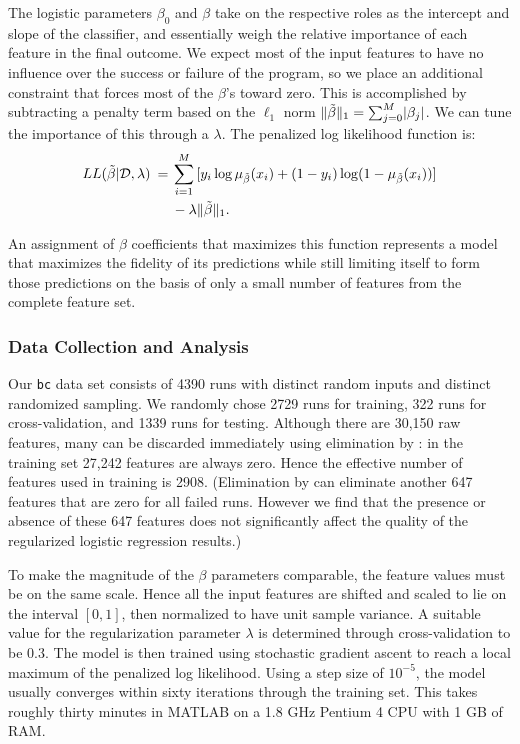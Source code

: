 The logistic parameters $\beta_0$ and $\beta$ take on the respective roles as
the intercept and slope of the classifier, and essentially weigh the
relative importance of each feature in the final outcome.  We expect
most of the input features to have no influence over the success or
failure of the program, so we place an additional constraint that
forces most of the $\beta$'s toward zero.  This is accomplished by
subtracting a penalty term based on the $\ell_1$ norm $\lVert\tilde{\beta}\rVert_1 =
\sum_{j=0}^M \lvert\beta_j\rvert$.  We can tune the importance of this
 through a  $\lambda$.  The penalized log likelihood function is:
\begin{equation*}
  \begin{split}
    LL (\tilde{\beta} | \mathcal{D}, \lambda ) \:=\:
    & \sum_{i=1}^M \, [y_i \log \mu_{\tilde{\beta}} (x_i) + (1 - y_i) \log (1 - \mu_{\tilde{\beta}} (x_i))] \\
    & - \lambda \lVert\tilde{\beta}\rVert_1.
  \end{split}
\end{equation*}

An assignment of $\beta$ coefficients that maximizes this function
represents a model that maximizes the fidelity of its predictions
while still limiting itself to form those predictions on the basis of
only a small number of features from the complete feature set.

\subsubsection{Data Collection and Analysis}

Our \texttt{bc} data set consists of 4390 runs with distinct random
inputs and distinct randomized  sampling.  
We randomly chose 2729 runs for training, 322 runs for cross-validation, and 1339 runs
for testing.  Although there are 30,150 raw features, many can be
discarded immediately using elimination by :
in the training set 27,242 features are always zero.  Hence the
effective number of features used in training is 2908.  (Elimination
by  can eliminate another 647 features
that are zero for all failed runs.  However we find that the presence
or absence of these 647 features does not significantly affect the
quality of the regularized logistic regression results.)

To make the magnitude of the $\beta$ parameters comparable, the feature
values must be on the same scale.  Hence all the input features are
shifted and scaled to lie on the interval $[0, 1]$, then normalized to
have unit sample variance.  A suitable value for the regularization
parameter $\lambda$ is determined through cross-validation to be $0.3$.  The model
is then trained using stochastic gradient ascent to reach a local
maximum of the penalized log likelihood.  Using a step size of
$10^{-5}$, the model usually converges within sixty iterations through
the training set.  This takes roughly thirty minutes in MATLAB on a
1.8 GHz Pentium 4 CPU with 1 GB of RAM.

